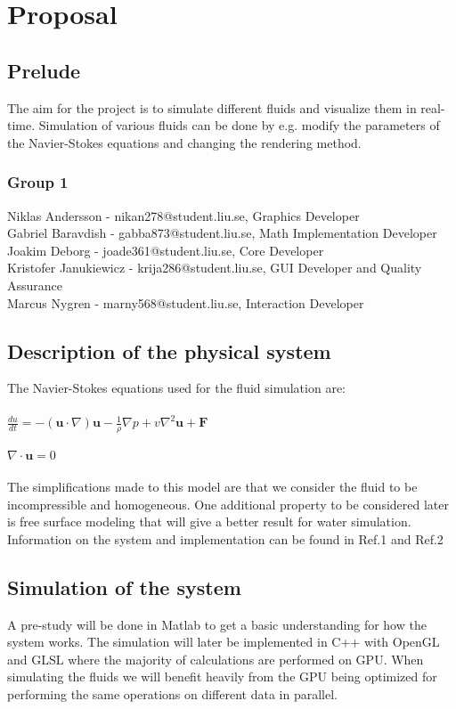 \documentclass[a4paper,12pt,twoside,swedish]{report}
\begin{document}
\pagestyle{plain}

\setcounter{page}{1}

\chapter{Proposal}

\section{Prelude}
The aim for the project is to simulate different fluids and visualize them in real-time. Simulation of various fluids can be done by e.g. modify the parameters of the Navier-Stokes equations and changing the rendering method.

 \subsection{Group 1}
Niklas Andersson - nikan278@student.liu.se, Graphics Developer\\
Gabriel Baravdish - gabba873@student.liu.se, Math Implementation Developer\\
Joakim Deborg - joade361@student.liu.se, Core Developer\\
Kristofer Janukiewicz - krija286@student.liu.se, GUI Developer and Quality Assurance\\
Marcus Nygren - marny568@student.liu.se, Interaction Developer

\section{Description of the physical system}
The Navier-Stokes equations used for the fluid simulation are:\\\\
\(\frac{du}{dt} = - (\textbf{u}\cdot{\nabla})\textbf{u} - \frac{1}{\rho}\nabla p + v \nabla^2 \textbf{u} + \textbf{F}\) \\\\
\(\nabla \cdot \textbf{u} = 0 \)\\\\
The simplifications made to this model are that we consider the fluid to be incompressible and homogeneous. One additional property to be considered later is free surface modeling that will give a better result for water simulation.
Information on the system and implementation can be found in Ref.1 and Ref.2

\section{Simulation of the system}
A pre-study will be done in Matlab to get a basic understanding for how the system works. The simulation will later be implemented in C++ with OpenGL and GLSL where the majority of calculations are performed on GPU. When simulating the fluids we will benefit heavily from the GPU being optimized for performing the same operations on different data in parallel.
\end{document}
